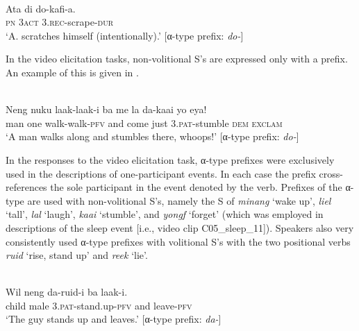 \ea%
\label{bkm:Ref283207000}
 \\ 
\gll    Ata  di  do-kafi-a.\\  
      \textsc{pn} 3\textsc{act}  3.\textsc{rec}{}-scrape-\textsc{dur}\\
\glt  `A. scratches himself (intentionally).' [α-type prefix: \textit{do-}]
\z







In the video elicitation tasks, non-volitional S's are expressed only with a prefix. An example of this is given in .


\ea%
\label{bkm:Ref383854029}
 \\ 
\gll    Neng  nuku  laak-laak-i  ba  me  la  da-kaai  yo  eya!\\  
    man  one  walk-walk-\textsc{pfv} and  come  just  3.\textsc{pat}{}-stumble  \textsc{dem} \textsc{exclam}\\
\glt  `A man walks along and stumbles there, whoops!' [α-type prefix: \textit{do-}]
\z



 



In the responses to the video elicitation task, α-type prefixes were exclusively used in the descriptions of one-participant events. In each case the prefix cross-references the sole participant in the event denoted by the verb. Prefixes of the α-type are used with non-volitional S's, namely the S of \textit{minang} `wake up', \textit{liel} `tall', \textit{lal} `laugh', \textit{kaai} `stumble', and \textit{yongf} `forget' (which was employed in descriptions of the sleep event [i.e., video clip C05\_sleep\_11]). Speakers also very consistently used α-type prefixes with volitional S's with the two positional verbs \textit{ruid} `rise, stand up' and \textit{reek} `lie'.


\ea 
{} \\ 
 \gll    Wil  neng  da-ruid-i  ba  laak-i.\\
    child  male  3.\textsc{pat}{}-stand.up-\textsc{pfv} and  leave-\textsc{pfv} \\
 \glt `The guy stands up and leaves.' [α-type prefix: \textit{da-}]
\z






